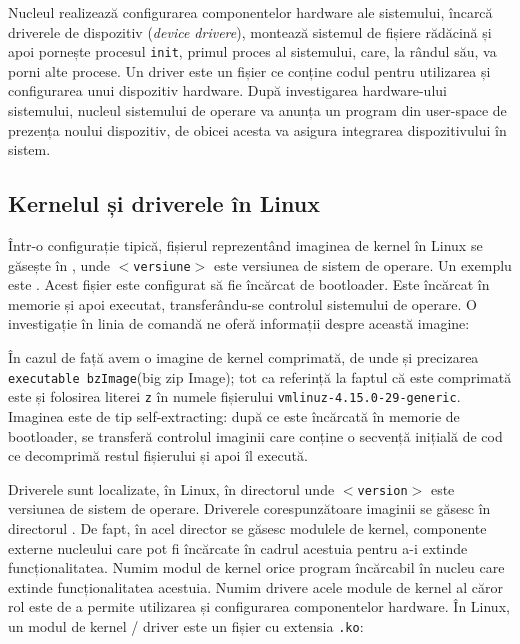 Nucleul realizează configurarea componentelor hardware ale sistemului, încarcă
driverele de dispozitiv (\textit{device drivere}), montează sistemul de fișiere rădăcină
și apoi pornește procesul \texttt{init}, primul proces al sistemului, care, la rândul său,
va porni alte procese. Un driver este un fișier ce conține codul
pentru utilizarea și configurarea unui dispozitiv hardware. După investigarea
hardware-ului sistemului, nucleul sistemului de operare va anunța un program din user-space
de prezența noului dispozitiv, de obicei acesta va asigura integrarea dispozitivului în sistem.

\subsection{Kernelul și driverele în Linux}
\label{sec:boot:os-linux}

Într-o configurație tipică, fișierul reprezentând imaginea de kernel în Linux se
găsește în , unde \texttt{$<$versiune$>$} este versiunea de sistem de
operare. Un exemplu este . Acest fișier este
configurat să fie încărcat de bootloader. Este încărcat în memorie și apoi
executat, transferându-se controlul sistemului de operare. O investigație în
linia de comandă ne oferă informații despre această imagine:


În cazul de față avem o imagine de kernel comprimată,
de unde și precizarea \texttt{executable bzImage}(big zip Image); tot ca referință la faptul că este
comprimată este și folosirea literei \texttt{z} în numele fișierului
\texttt{vmlinuz-4.15.0-29-generic}. Imaginea este de tip self-extracting: după ce este
încărcată în memorie de bootloader, se transferă controlul imaginii care conține
o secvență inițială de cod ce decomprimă restul fișierului și apoi îl execută.

Driverele sunt localizate, în Linux, în directorul 
unde \texttt{$<$version$>$} este versiunea de sistem de operare. Driverele
corespunzătoare imaginii  se găsesc în directorul
. De fapt, în acel director se
găsesc modulele de kernel, componente externe nucleului care pot fi încărcate în
cadrul acestuia pentru a-i extinde funcționalitatea. Numim modul de kernel orice program
încărcabil în nucleu care extinde funcționalitatea acestuia. Numim drivere acele module de kernel al căror rol este de a permite
utilizarea și configurarea componentelor hardware.  În Linux, un modul de kernel / driver este un fișier cu extensia \texttt{.ko}:

